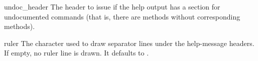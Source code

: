 \begin{memberdesc}{undoc_header}
The header to issue if the help output has a section for undocumented 
commands (that is, there are  methods without
corresponding  methods).
\end{memberdesc}

\begin{memberdesc}{ruler}
The character used to draw separator lines under the help-message
headers.  If empty, no ruler line is drawn.  It defaults to
\character{=}.
\end{memberdesc}


